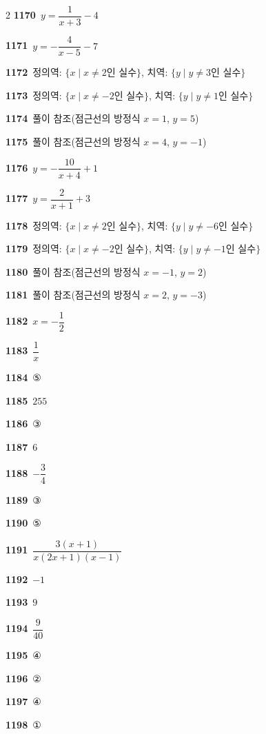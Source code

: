 \documentclass[10pt,a4paper]{article}
\begin{document}
\begin{multicols}{2}
\noindent\textbf{1170}\ $y=\dfrac{1}{x+3}-4$\par
\noindent\textbf{1171}\ $y=-\dfrac{4}{x-5}-7$\par
\noindent\textbf{1172}\ 정의역: $\{x \mid x\ne 2$인 실수$\}$, 치역: $\{y \mid y\ne 3$인 실수$\}$\par
\noindent\textbf{1173}\ 정의역: $\{x \mid x\ne -2$인 실수$\}$, 치역: $\{y \mid y\ne 1$인 실수$\}$\par
\noindent\textbf{1174}\ 풀이 참조(점근선의 방정식 $x=1$, $y=5$)\par
\noindent\textbf{1175}\ 풀이 참조(점근선의 방정식 $x=4$, $y=-1$)\par
\noindent\textbf{1176}\ $y=-\dfrac{10}{x+4}+1$\par
\noindent\textbf{1177}\ $y=\dfrac{2}{x+1}+3$\par
\noindent\textbf{1178}\ 정의역: $\{x \mid x\ne 2$인 실수$\}$, 치역: $\{y \mid y\ne -6$인 실수$\}$\par
\noindent\textbf{1179}\ 정의역: $\{x \mid x\ne -2$인 실수$\}$, 치역: $\{y \mid y\ne -1$인 실수$\}$\par
\noindent\textbf{1180}\ 풀이 참조(점근선의 방정식 $x=-1$, $y=2$)\par
\noindent\textbf{1181}\ 풀이 참조(점근선의 방정식 $x=2$, $y=-3$)\par
\noindent\textbf{1182}\ $x=-\dfrac{1}{2}$\par
\noindent\textbf{1183}\ $\dfrac{1}{x}$\par
\noindent\textbf{1184}\ ⑤\par
\noindent\textbf{1185}\ $255$\par
\noindent\textbf{1186}\ ③\par
\noindent\textbf{1187}\ $6$\par
\noindent\textbf{1188}\ $-\dfrac{3}{4}$\par
\noindent\textbf{1189}\ ③\par
\noindent\textbf{1190}\ ⑤\par
\noindent\textbf{1191}\ $\dfrac{3(x+1)}{x(2x+1)(x-1)}$\par
\noindent\textbf{1192}\ $-1$\par
\noindent\textbf{1193}\ $9$\par
\noindent\textbf{1194}\ $\dfrac{9}{40}$\par
\noindent\textbf{1195}\ ④\par
\noindent\textbf{1196}\ ②\par
\noindent\textbf{1197}\ ④\par
\noindent\textbf{1198}\ ①\par

\end{multicols}
\end{document}
